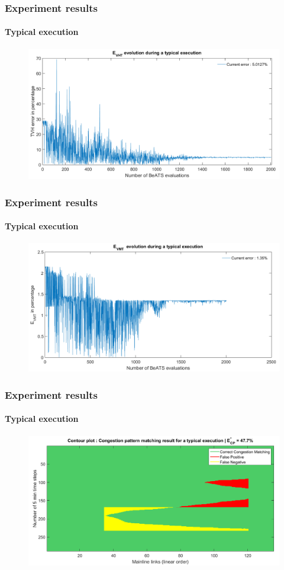 \documentclass[fleqn]{beamer}
\begin{document}
\begin{frame}
	\frametitle{Experiment results}
	\framesubtitle{Typical execution}
	\begin{figure}
		\centering
		\includegraphics[width=4.5in]{figures/results_figures/VHTexample.png}
	\end{figure}
\end{frame}

\begin{frame}
	\frametitle{Experiment results}
	\framesubtitle{Typical execution}
	\begin{figure}
		\centering
		\includegraphics[width=4.5in]{figures/results_figures/VMTexample.png}
	\end{figure}
\end{frame}

\begin{frame}
	\frametitle{Experiment results}
	\framesubtitle{Typical execution}
	\begin{figure}
		\centering
		\includegraphics[width=4.5in]{figures/results_figures/typicalcpexample.png}
	\end{figure}
\end{frame}
\end{document}
